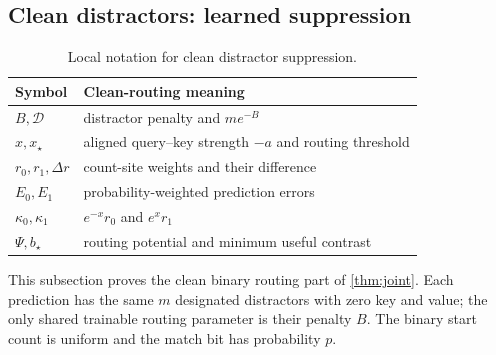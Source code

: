 \subsection{Clean distractors: learned suppression}
\label{app:J-clean}

\begin{table}[htbp]
\centering\small
\begin{tabular}{@{}ll@{}}
\toprule
Symbol & Clean-routing meaning\\
\midrule
$B,\mathcal D$ & distractor penalty and $me^{-B}$\\
$x,x_\star$ & aligned query--key strength $-a$ and routing threshold\\
$r_0,r_1,\Delta r$ & count-site weights and their difference\\
$E_0,E_1$ & probability-weighted prediction errors\\
$\kappa_0,\kappa_1$ & $e^{-x}r_0$ and $e^x r_1$\\
$\Psi,b_\star$ & routing potential and minimum useful contrast\\
\bottomrule
\end{tabular}
\caption{Local notation for clean distractor suppression.}
\label{tab:CR-notation}
\end{table}

This subsection proves the clean binary routing part of \cref{thm:joint}. Each prediction has the same $m$ designated distractors
with zero key and value; the only shared trainable routing parameter is their penalty $B$.
The binary start count is uniform and the match bit has probability $p$.

